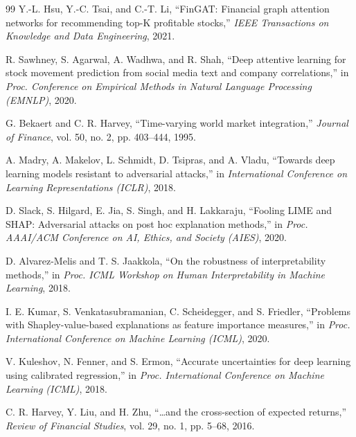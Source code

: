 \documentclass[conference]{IEEEtran}
\begin{document}
\begin{thebibliography}{99}
Y.-L. Hsu, Y.-C. Tsai, and C.-T. Li, ``FinGAT: Financial graph attention networks for recommending top-K profitable stocks,'' \textit{IEEE Transactions on Knowledge and Data Engineering}, 2021.

R. Sawhney, S. Agarwal, A. Wadhwa, and R. Shah, ``Deep attentive learning for stock movement prediction from social media text and company correlations,'' in \textit{Proc. Conference on Empirical Methods in Natural Language Processing (EMNLP)}, 2020.


G. Bekaert and C. R. Harvey, ``Time-varying world market integration,'' \textit{Journal of Finance}, vol. 50, no. 2, pp. 403--444, 1995.


A. Madry, A. Makelov, L. Schmidt, D. Tsipras, and A. Vladu, ``Towards deep learning models resistant to adversarial attacks,'' in \textit{International Conference on Learning Representations (ICLR)}, 2018.

D. Slack, S. Hilgard, E. Jia, S. Singh, and H. Lakkaraju, ``Fooling LIME and SHAP: Adversarial attacks on post hoc explanation methods,'' in \textit{Proc. AAAI/ACM Conference on AI, Ethics, and Society (AIES)}, 2020.

D. Alvarez-Melis and T. S. Jaakkola, ``On the robustness of interpretability methods,'' in \textit{Proc. ICML Workshop on Human Interpretability in Machine Learning}, 2018.

I. E. Kumar, S. Venkatasubramanian, C. Scheidegger, and S. Friedler, ``Problems with Shapley-value-based explanations as feature importance measures,'' in \textit{Proc. International Conference on Machine Learning (ICML)}, 2020.


V. Kuleshov, N. Fenner, and S. Ermon, ``Accurate uncertainties for deep learning using calibrated regression,'' in \textit{Proc. International Conference on Machine Learning (ICML)}, 2018.

C. R. Harvey, Y. Liu, and H. Zhu, ``\ldots and the cross-section of expected returns,'' \textit{Review of Financial Studies}, vol. 29, no. 1, pp. 5--68, 2016.


\end{thebibliography}
\end{document}
